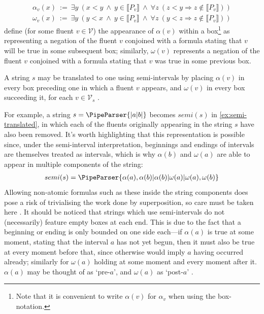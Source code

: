 \documentclass[a4paper,12pt,leqno]{article}
\newcommand{\vph}[1]{\vphantom{#1}}
\newcommand{\ebox}[1]{\fbox{$\vph{'(),}#1$}}
\newcommand{\V}{\mathcal{V}}
\newcommand{\EventString}[1]{%
	\renewcommand*{\do}[1]{\ebox{##1}}%
	\PipeParser{#1}%
}
\begin{document}
\begin{align}
	\alpha_v(x) ~:=~ \exists y ~(x < y ~\land~ y \in \llbracket P_v \rrbracket ~\land~ \forall z ~(z < y \Longrightarrow z \notin \llbracket P_v \rrbracket))\label{def:alpha}\\
	\omega_v(x) ~:=~ \exists y ~(y < x ~\land~ y \in \llbracket P_v \rrbracket ~\land~ \forall z ~(y < z \Longrightarrow z \notin \llbracket P_v \rrbracket))\label{def:omega}
\end{align}
 define (for some fluent $v \in \V$) the appearance of $\alpha(v)$ within a box\footnote{Note that it is convenient to write $\alpha(v)$ for $\alpha_v$ when using the box-notation.} as representing a negation of the fluent $v$ conjoined with a formula stating that $v$ will be true in some subsequent box; similarly, $\omega(v)$ represents a negation of the fluent $v$ conjoined with a formula stating that $v$ was true in some previous box. 

A string $s$ may be translated to one using semi-intervals by placing $\alpha(v)$ in every box preceding one in which a fluent $v$ appears, and $\omega(v)$ in every box succeeding it, for each $v \in \V_s$ \citep{woods2018improving}.

For example, a string $s = \EventString{{}|a|b|{}}$ becomes $semi(s)$ in \cref{ex:semi-translated}, in which each of the fluents originally appearing in the string $s$ have also been removed. It's worth highlighting that this representation is possible since, under the semi-interval interpretation, beginnings and endings of intervals are themselves treated as intervals, which is why $\alpha(b)$ and $\omega(a)$ are able to appear in multiple components of the string:
\begin{align}
	semi(s) = \EventString{\alpha(a),\alpha(b)|\alpha(b)|\omega(a)|\omega(a),\omega(b)}\label{ex:semi-translated}
\end{align}
Allowing non-atomic formulas such as these inside the string components does pose a risk of trivialising the work done by superposition, so care must be taken here \citep{woods2018improving}. It should be noticed that strings which use semi-intervals do not (necessarily) feature empty boxes at each end. This is due to the fact that a beginning or ending is only bounded on one side each---if $\alpha(a)$ is true at some moment, stating that the interval $a$ has not yet begun, then it must also be true at every moment before that, since otherwise would imply $a$ having occurred already; similarly for $\omega(a)$ holding at some moment and every moment after it. $\alpha(a)$ may be thought of as `pre-$a$', and $\omega(a)$ as `post-$a$' \citep{woods2018improving}.
\end{document}
